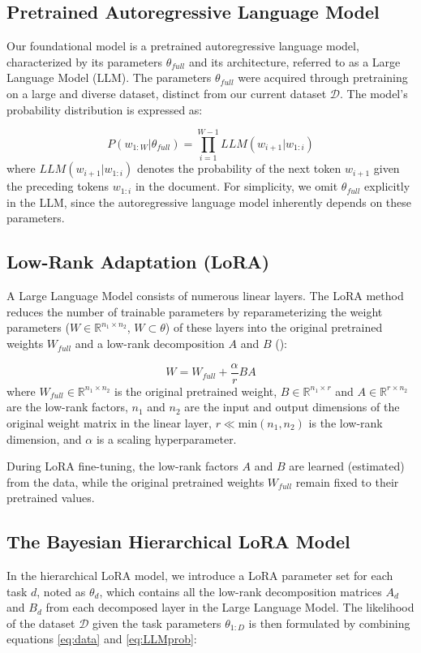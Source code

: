 \documentclass[fullpaper,final]{nldl}
\newcommand{\R}{\mathbb{R}}
\begin{document}
\subsection{Pretrained Autoregressive Language Model}
Our foundational model is a pretrained autoregressive language model, characterized by its parameters $\theta_{full}$ and its architecture, referred to as a Large Language Model (LLM). The parameters $\theta_{full}$ were acquired through pretraining on a large and diverse dataset, distinct from our current dataset $\mathcal{D}$.
The model's probability distribution is expressed as:

\begin{equation} \label{eq:LLMprob}
P(w_{1:W} | \theta_{full}) = \prod_{i=1}^{W-1} LLM(w_{i+1} | w_{1:i})
\end{equation}
where $LLM(w_{i+1} | w_{1:i})$ denotes the probability of the next token $w_{i+1}$ given the preceding tokens $w_{1:i}$ in the document.
For simplicity, we omit $\theta_{full}$ explicitly in the LLM, since the autoregressive language model inherently depends on these parameters.

\subsection{Low-Rank Adaptation (LoRA)}
A Large Language Model consists of numerous linear layers. The LoRA method reduces the number of trainable parameters by reparameterizing the weight parameters ($W \in \R^{n_1 \times n_2}$, $W \subset \theta$) of these layers into the original pretrained weights $W_{full}$ and a low-rank decomposition $A$ and $B$ (\cite{hayouLoRAEfficientLow2024}):

\begin{equation} \label{eq:LoRA}
    W = W_{full} + \frac{\alpha}{r} BA
\end{equation}
%
where
$W_{full} \in \R^{n_1 \times n_2}$ is the original pretrained weight,
$B \in \R^{n_1 \times r}$ and $A \in \R^{r \times n_2}$ are the low-rank factors,
$n_1$ and $n_2$ are the input and output dimensions of the original weight matrix in the linear layer,
$r \ll \text{min}(n_1, n_2)$ is the low-rank dimension,
and $\alpha$ is a scaling hyperparameter.

During LoRA fine-tuning, the low-rank factors $A$ and $B$ are learned (estimated) from the data, while the original pretrained weights $W_{full}$ remain fixed to their pretrained values.

\subsection{The Bayesian Hierarchical LoRA Model} \label{sec:BoRA}
In the hierarchical LoRA model, we introduce a LoRA parameter set for each task $d$, noted as $\theta_d$, which contains all the low-rank decomposition matrices $A_d$ and $B_d$ from each decomposed layer in the Large Language Model. The likelihood of the dataset $\mathcal{D}$ given the task parameters $\theta_{1:D}$ is then formulated by combining equations \ref{eq:data} and \ref{eq:LLMprob}:
\end{document}

